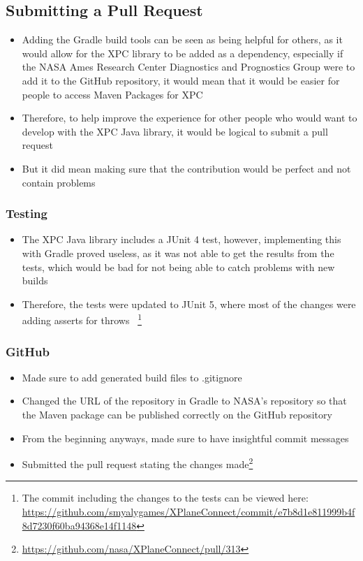 \documentclass[../dissertation.tex]{subfiles}
\begin{document}
\subsection{Submitting a Pull Request}
\begin{itemize}
  \item Adding the Gradle build tools can be seen as being helpful
    for others, as it would allow for the XPC library to be added
    as a dependency, especially if the NASA Ames Research Center Diagnostics and Prognostics Group
    were to add it to the GitHub repository, it would mean that it would be easier for
    people to access Maven Packages for XPC
  \item Therefore, to help improve the experience for other people who would want
    to develop with the XPC Java library, it would be logical to submit a
    pull request
  \item But it did mean making sure that the contribution would be perfect and not contain problems %
\end{itemize}

\subsubsection{Testing}
\begin{itemize}
  \item The XPC Java library includes a JUnit 4 test, however, implementing this
    with Gradle proved useless, as it was not able to get the results from the
    tests, which would be bad for not being able to catch problems with new builds
  \item Therefore, the tests were updated to JUnit 5, where most of the changes were
    adding asserts for throws~\cite{junit:migrate}
    \footnote{The commit including the changes to the tests can be viewed here:
    \url{https://github.com/smyalygames/XPlaneConnect/commit/e7b8d1e811999b4f8d7230f60ba94368e14f1148}}
\end{itemize}

\subsubsection{GitHub}
\begin{itemize}
  \item Made sure to add generated build files to .gitignore
  \item Changed the URL of the repository in Gradle to NASA's repository so that
    the Maven package can be published correctly on the GitHub repository
  \item From the beginning anyways, made sure to have insightful commit messages
  \item Submitted the pull request stating the changes made\footnote{\url{https://github.com/nasa/XPlaneConnect/pull/313}}
\end{itemize}
\end{document}
